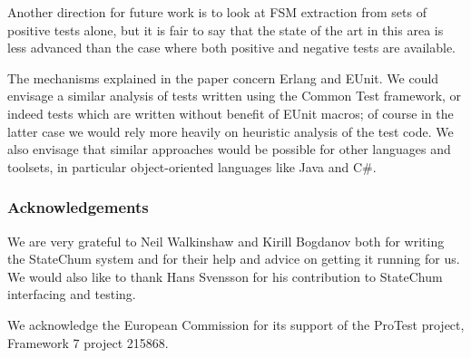 \documentclass[]{sigplanconf}
\begin{document}
Another direction for future work is to look at FSM extraction from sets of positive tests alone, but it is fair to say that the state of the art in this area is less advanced than the case where both positive and negative tests are available.

The mechanisms explained in the paper concern Erlang and EUnit. We could envisage a similar analysis of tests written using the Common Test framework, or indeed tests which are written without benefit of EUnit macros; of course in the latter case we would rely more heavily on heuristic analysis of the test code. We also envisage that similar approaches would be possible for other languages and toolsets, in particular object-oriented languages like Java and C\#.


\subsubsection*{Acknowledgements}
We are very grateful to Neil Walkinshaw and Kirill Bogdanov both for writing the StateChum system and for their help and advice on getting it running for us. We would also like to thank Hans Svensson for his contribution to StateChum interfacing and testing. 

We acknowledge the European Commission for its support of the ProTest project, Framework 7 project 215868. 



{}

\end{document}
